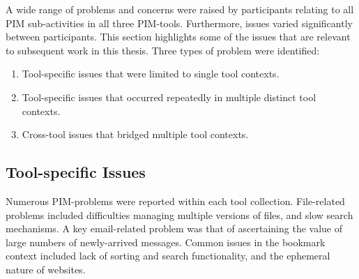 A wide range of problems and concerns were raised by participants relating to all PIM sub-activities in all three PIM-tools.  Furthermore, issues varied significantly between participants.  This section highlights some of the issues that are relevant to subsequent work in this thesis.  Three types of problem were identified:
\begin{enumerate}
\item Tool-specific issues that were limited to single tool contexts.
\item Tool-specific issues that occurred repeatedly in multiple distinct tool contexts.
\item Cross-tool issues that bridged multiple tool contexts. 
\end{enumerate}

\subsection{Tool-specific Issues}
\label{exp-study:tool-specific}
Numerous PIM-problems were reported within each tool collection.  File-related problems included difficulties managing multiple versions of files, and slow search mechanisms.  A key email-related problem was that of ascertaining the value of large numbers of newly-arrived messages.  Common issues in the bookmark context included lack of sorting and search functionality, and the ephemeral nature of websites.

